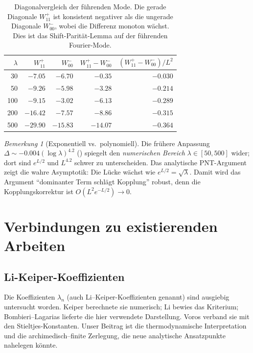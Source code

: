 ﻿\documentclass[12pt,a4paper]{article}
\theoremstyle{definition}
\theoremstyle{remark}
\newtheorem{remark}[theorem]{Bemerkung}
\begin{document}
\begin{table}[h]
\centering
\small
\renewcommand{\arraystretch}{1.15}
\begin{tabular}{r|r|r|r|r}
$\lambda$ & $W_{11}^+$ & $W_{00}^-$ & $W_{11}^+\! -\! W_{00}^-$ & $(W_{11}^+\! -\! W_{00}^-)/L^2$ \\\hline
30  & $-7.05$  & $-6.70$  & $-0.35$ & $-0.030$ \\
50  & $-9.26$  & $-5.98$  & $-3.28$ & $-0.214$ \\
100 & $-9.15$  & $-3.02$  & $-6.13$ & $-0.289$ \\
200 & $-16.42$ & $-7.57$  & $-8.86$ & $-0.315$ \\
500 & $-29.90$ & $-15.83$ & $-14.07$ & $-0.364$
\end{tabular}
\caption{Diagonalvergleich der führenden Mode. Die gerade Diagonale $W_{11}^+$ ist konsistent negativer als die ungerade Diagonale $W_{00}^-$, wobei die Differenz monoton wächst. Dies ist das Shift-Parität-Lemma auf der führenden Fourier-Mode.}
\label{tab:leading-mode}
\end{table}

\begin{remark}[Exponentiell vs.\ polynomiell]
Die frühere Anpassung $\Delta \sim -0.004(\log\lambda)^{4.2}$ () spiegelt den \emph{numerischen Bereich} $\lambda \in [50,500]$ wider; dort sind $e^{L/2}$ und $L^{4.2}$ schwer zu unterscheiden. Das analytische PNT-Argument zeigt die wahre Asymptotik: Die Lücke wächst wie $e^{L/2}=\sqrt{\lambda}$. Damit wird das Argument ``dominanter Term schlägt Kopplung'' robust, denn die Kopplungskorrektur ist $O(L^2 e^{-L/2}) \to 0$.
\end{remark}


\section{Verbindungen zu existierenden Arbeiten}

\subsection{Li-Keiper-Koeffizienten}
Die Koeffizienten $\lambda_n$ (auch Li--Keiper-Koeffizienten genannt) sind ausgiebig untersucht worden. Keiper \cite{Keiper1992} berechnete sie numerisch; Li \cite{Li1997} bewies das Kriterium; Bombieri--Lagarias \cite{BombieriLagarias1999} lieferte die hier verwendete Darstellung. Voros \cite{Voros2004} verband sie mit den Stieltjes-Konstanten. Unser Beitrag ist die thermodynamische Interpretation und die archimedisch--finite Zerlegung, die neue analytische Ansatzpunkte nahelegen könnte.
\end{document}
